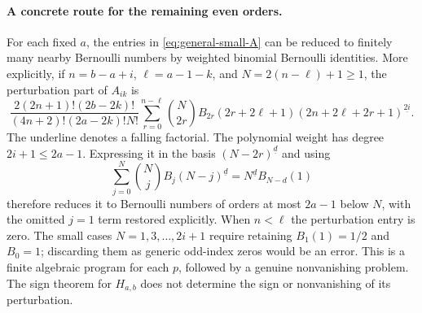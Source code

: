 \paragraph{A concrete route for the remaining even orders.}
For each fixed $a$, the entries in \eqref{eq:general-small-A} can be
reduced to finitely many nearby Bernoulli numbers by weighted
binomial Bernoulli identities.  More explicitly, if
$n=b-a+i$, $\ell=a-1-k$, and $N=2(n-\ell)+1\geq1$, the perturbation
part of $A_{ik}$ is
\[
 \frac{2(2n+1)!(2b-2k)!}
 {(4n+2)!(2a-2k)!N!}
 \sum_{r=0}^{n-\ell}\binom N{2r}B_{2r}
 (2r+2\ell+1)
 (2n+2\ell+2r+1)^{\underline{2i}}.
\]
The underline denotes a falling factorial.  The polynomial weight
has degree $2i+1\leq2a-1$.  Expressing it in the basis
$(N-2r)^{\underline d}$ and using
\[
 \sum_{j=0}^N\binom Nj B_j(N-j)^{\underline d}
   =N^{\underline d}B_{N-d}(1)
\]
therefore reduces it to Bernoulli numbers of orders at most $2a-1$
below $N$, with the omitted $j=1$ term restored explicitly.
When $n<\ell$ the perturbation entry is zero.  The small cases
$N=1,3,\ldots,2i+1$ require retaining $B_1(1)=1/2$ and $B_0=1$;
discarding them as generic odd-index zeros would be an error.
This is a finite algebraic program for each $p$, followed by a
genuine nonvanishing problem.  The sign theorem for $H_{a,b}$
does not determine the sign or nonvanishing of its perturbation.
